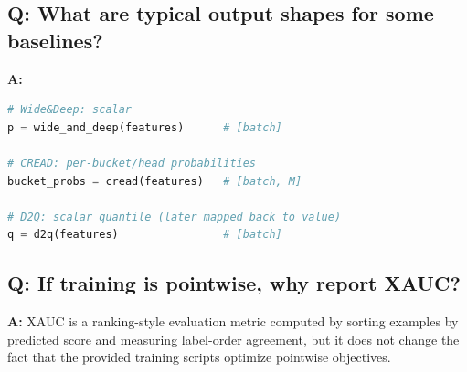\subsection{Q: What are typical output shapes for some baselines?}
\noindent\textbf{A:}
\begin{lstlisting}[language=Python]
# Wide&Deep: scalar
p = wide_and_deep(features)      # [batch]

# CREAD: per-bucket/head probabilities
bucket_probs = cread(features)   # [batch, M]

# D2Q: scalar quantile (later mapped back to value)
q = d2q(features)                # [batch]
\end{lstlisting}

\subsection{Q: If training is pointwise, why report XAUC?}
\noindent\textbf{A:} XAUC is a ranking-style evaluation metric computed by sorting examples by predicted score and measuring label-order agreement, but it does not change the fact that the provided training scripts optimize pointwise objectives.
